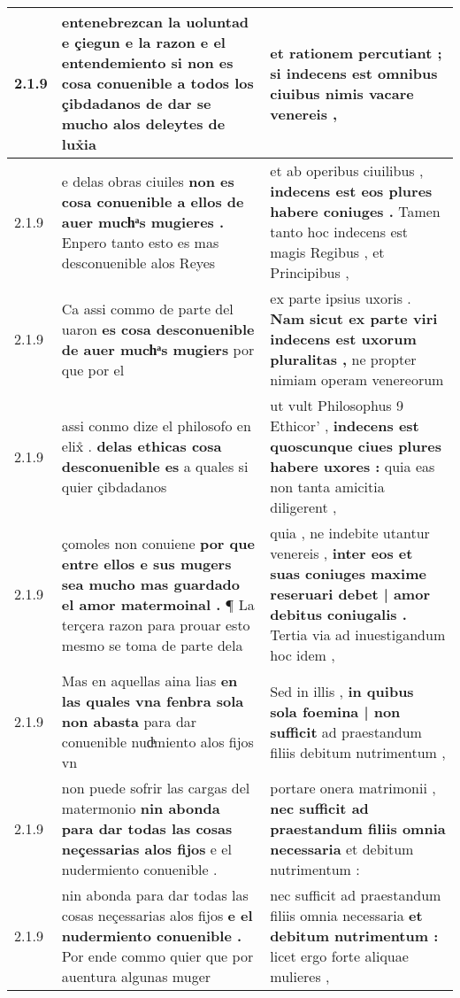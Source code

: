 \begin{tabular}{|p{1cm}|p{6.5cm}|p{6.5cm}|}
2.1.9 & entenebrezcan la uoluntad e çiegun e la razon e el entendemiento \textbf{ si non es cosa conuenible a todos los çibdadanos de dar se } mucho alos deleytes de lux̉ia & et rationem percutiant ; \textbf{ si indecens est omnibus ciuibus } nimis vacare venereis , \\\hline
2.1.9 & e delas obras ciuiles \textbf{ non es cosa conuenible a ellos de auer muchͣs mugieres . } Enpero tanto esto es mas desconuenible alos Reyes & et ab operibus ciuilibus , \textbf{ indecens est eos plures habere coniuges . } Tamen tanto hoc indecens est magis Regibus , et Principibus , \\\hline
2.1.9 & Ca assi commo de parte del uaron \textbf{ es cosa desconuenible de auer muchͣs mugiers } por que por el & ex parte ipsius uxoris . \textbf{ Nam sicut ex parte viri indecens est uxorum pluralitas , } ne propter nimiam operam venereorum \\\hline
2.1.9 & assi conmo dize el philosofo en elix̊ . \textbf{ delas ethicas cosa desconuenible es } a quales si quier çibdadanos & ut vult Philosophus 9 Ethicor’ , \textbf{ indecens est quoscunque ciues plures habere uxores : } quia eas non tanta amicitia diligerent , \\\hline
2.1.9 & çomoles non conuiene \textbf{ por que entre ellos e sus mugers sea mucho mas guardado el amor matermoinal . } ¶ La terçera razon para prouar esto mesmo se toma de parte dela & quia , ne indebite utantur venereis , \textbf{ inter eos et suas coniuges maxime reseruari debet | amor debitus coniugalis . } Tertia via ad inuestigandum hoc idem , \\\hline
2.1.9 & Mas en aquellas aina lias \textbf{ en las quales vna fenbra sola non abasta } para dar conuenible nudͣmiento alos fijos vn & Sed in illis , \textbf{ in quibus sola foemina | non sufficit } ad praestandum filiis debitum nutrimentum , \\\hline
2.1.9 & non puede sofrir las cargas del matermonio \textbf{ nin abonda para dar todas las cosas neçessarias alos fijos } e el nudermiento conuenible . & portare onera matrimonii , \textbf{ nec sufficit ad praestandum filiis omnia necessaria } et debitum nutrimentum : \\\hline
2.1.9 & nin abonda para dar todas las cosas neçessarias alos fijos \textbf{ e el nudermiento conuenible . } Por ende commo quier que por auentura algunas muger & nec sufficit ad praestandum filiis omnia necessaria \textbf{ et debitum nutrimentum : } licet ergo forte aliquae mulieres , \\\hline

\end{tabular}
